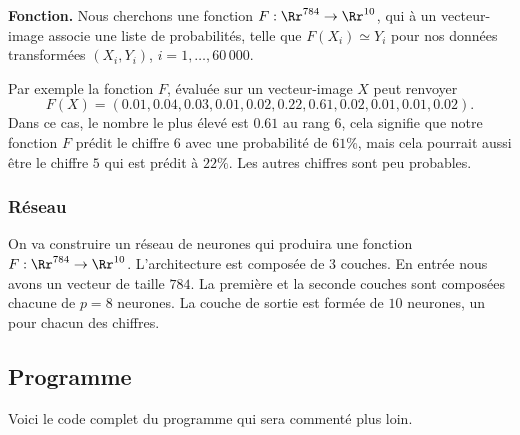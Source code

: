 \documentclass[11pt,class=report,crop=false]{standalone}
\begin{document}
\bigskip

\textbf{Fonction.}
Nous cherchons une fonction $F : \Rr^{784} \to \Rr^{10}$, qui à un vecteur-image associe une liste de probabilités, telle que 
$F(X_i) \simeq Y_i$ pour nos données transformées $(X_i,Y_i)$, $i=1,\ldots,60\,000$.

Par exemple la fonction $F$, évaluée sur un vecteur-image $X$ peut renvoyer
$$F(X) = (0.01, 0.04, 0.03, 0.01, 0.02, 0.22, 0.61, 0.02, 0.01, 0.01, 0.02).$$
Dans ce cas, le nombre le plus élevé est $0.61$ au rang $6$, cela signifie que notre fonction $F$ prédit le chiffre $6$ avec une probabilité de $61\%$, mais cela pourrait aussi être le chiffre $5$ qui est prédit à $22\%$. Les autres chiffres sont peu probables.



\subsubsection*{Réseau}

On va construire un réseau de neurones qui produira une fonction $F : \Rr^{784} \to \Rr^{10}$. L'architecture est composée de $3$ couches. En entrée nous avons un vecteur de taille $784$. La première et la seconde couches sont composées chacune de $p=8$ neurones. La couche de sortie est formée de $10$ neurones, un pour chacun des chiffres.


\subsection{Programme}

Voici le code complet du programme qui sera commenté plus loin.
\end{document}
